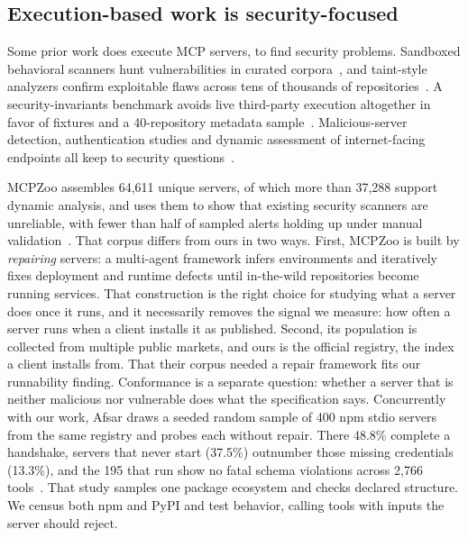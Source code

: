 \subsection{Execution-based work is security-focused}
Some prior work does execute MCP servers, to find security problems. Sandboxed
behavioral scanners hunt vulnerabilities in curated corpora~\cite{sandboxscan}, and
taint-style analyzers confirm exploitable flaws across tens of thousands of
repositories~\cite{viper}. A security-invariants benchmark avoids live third-party
execution altogether in favor of fixtures and a 40-repository metadata
sample~\cite{securityinvariants}. Malicious-server detection, authentication studies
and dynamic assessment of internet-facing endpoints all keep to security
questions~\cite{maliciousmcp,remoteauth,exposedbydesign}.

MCPZoo assembles 64,611 unique servers, of
which more than 37,288 support dynamic analysis, and uses them to show that existing
security scanners are unreliable, with fewer than half of sampled alerts holding up
under manual validation~\cite{mcpzoo}. That corpus differs from ours in two ways. First, MCPZoo is built by \emph{repairing}
servers: a multi-agent framework infers environments and iteratively fixes deployment
and runtime defects until in-the-wild repositories become running services. That
construction is the right choice for studying what a server does once it runs, and it
necessarily removes the signal we measure: how often a server runs when a
client installs it as published. Second, its population is collected from
multiple public markets, and ours is the official registry, the index a client
installs from. That their corpus needed a repair framework fits our runnability finding.
Conformance is a separate question: whether a server that is neither malicious nor vulnerable does what the
specification says. Concurrently with our work, Afsar draws a seeded random sample of
400 npm stdio servers from the same registry and probes each without repair. There
48.8\% complete a handshake, servers that never start (37.5\%) outnumber those missing
credentials (13.3\%), and the 195 that run show no fatal schema violations across
2,766 tools~\cite{randomdraw2026}. That study samples one package ecosystem and checks
declared structure. We census both npm and PyPI and test behavior, calling tools
with inputs the server should reject.


